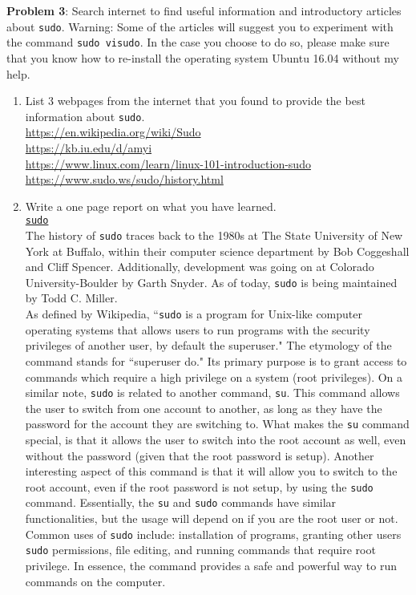 \documentclass[12pt]{article}
\begin{document}
\textbf{Problem 3}: Search internet to find useful information and introductory articles about \texttt{sudo}. Warning: Some of the articles will suggest you to experiment with the command \texttt{sudo visudo}. In the case you choose to do so, please make sure that you know how to re-install the operating system Ubuntu 16.04 without my help.
\begin{enumerate} [label=(\alph*)]
	\item List 3 webpages from the internet that you found to provide the best information about \texttt{sudo}. \\
	\url{https://en.wikipedia.org/wiki/Sudo} \\
	\url{https://kb.iu.edu/d/amyi} \\
	\url{https://www.linux.com/learn/linux-101-introduction-sudo} \\
	\url{https://www.sudo.ws/sudo/history.html} \\
	
	\item Write a one page report on what you have learned. \\
		\underline{\texttt{sudo}} \\
		The history of \texttt{sudo} traces back to the 1980s at The State University of New York at Buffalo, within their computer science department by Bob Coggeshall and Cliff Spencer. Additionally, development was going on at Colorado University-Boulder by Garth Snyder. As of today, \texttt{sudo} is being maintained by Todd C. Miller. \\
		As defined by Wikipedia, ``\texttt{sudo} is a program for Unix-like computer operating systems that allows users to run programs with the security privileges of another user, by default the superuser." The etymology of the command stands for ``superuser do." Its primary purpose is to grant access to commands which require a high privilege on a system (root privileges). On a similar note, \texttt{sudo} is related to another command, \texttt{su}. This command allows the user to switch from one account to another, as long as they have the password for the account they are switching to. What makes the \texttt{su} command special, is that it allows the user to switch into the root account as well, even without the password (given that the root password is setup). Another interesting aspect of this command is that it will allow you to switch to the root account, even if the root password is not setup, by using the \texttt{sudo} command. Essentially, the \texttt{su} and \texttt{sudo} commands have similar functionalities, but the usage will depend on if you are the root user or not. \\
		Common uses of \texttt{sudo} include: installation of programs, granting other users \texttt{sudo} permissions, file editing, and running commands that require root privilege. In essence, the command provides a safe and powerful way to run commands on the computer.
\end{enumerate}

	
\end{document}
